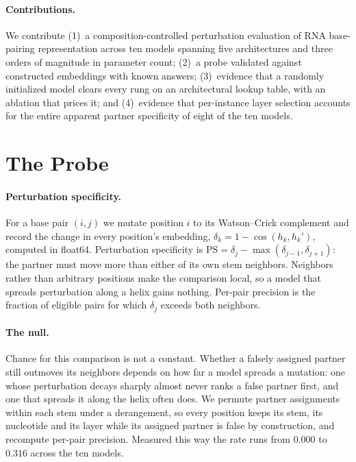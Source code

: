 \documentclass{article}
\begin{document}
\paragraph{Contributions.} We contribute (1)~a composition-controlled
perturbation evaluation of RNA base-pairing representation across ten models
spanning five architectures and three orders of magnitude in parameter count;
(2)~a probe validated against constructed embeddings with known answers;
(3)~evidence that a randomly initialized model clears every rung on an
architectural lookup table, with an ablation that prices it; and (4)~evidence
that per-instance layer selection accounts for the entire apparent partner
specificity of eight of the ten models.

\section{The Probe}
\label{sec:probe}

\paragraph{Perturbation specificity.} For a base pair $(i, j)$ we mutate
position $i$ to its Watson--Crick complement and record the change in every
position's embedding, $\delta_k = 1 - \cos(h_k, h_k')$, computed in float64.
Perturbation specificity is
$\mathrm{PS} = \delta_j - \max(\delta_{j-1}, \delta_{j+1})$: the partner must
move more than either of its own stem neighbors. Neighbors rather than arbitrary
positions make the comparison local, so a model that spreads perturbation along
a helix gains nothing. Per-pair precision is the fraction of eligible pairs for
which $\delta_j$ exceeds both neighbors.

\paragraph{The null.} Chance for this comparison is not a constant. Whether a
falsely assigned partner still outmoves its neighbors depends on how far a model
spreads a mutation: one whose perturbation decays sharply almost never ranks a
false partner first, and one that spreads it along the helix often does. We
permute partner assignments within each stem under a derangement, so every
position keeps its stem, its nucleotide and its layer while its assigned partner
is false by construction, and recompute per-pair precision. Measured this way the
rate runs from $0.000$ to $0.316$ across the ten models.
\end{document}
